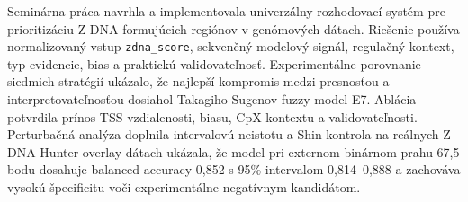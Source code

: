 \documentclass[12pt,a4paper]{article}
\begin{document}
Seminárna práca navrhla a implementovala univerzálny rozhodovací systém pre prioritizáciu Z-DNA-formujúcich regiónov v genómových dátach. Riešenie používa normalizovaný vstup \texttt{zdna\_score}, sekvenčný modelový signál, regulačný kontext, typ evidencie, bias a praktickú validovateľnosť. Experimentálne porovnanie siedmich stratégií ukázalo, že najlepší kompromis medzi presnosťou a interpretovateľnosťou dosiahol Takagiho-Sugenov fuzzy model E7. Ablácia potvrdila prínos TSS vzdialenosti, biasu, CpX kontextu a validovateľnosti. Perturbačná analýza doplnila intervalovú neistotu a Shin kontrola na reálnych Z-DNA Hunter overlay dátach ukázala, že model pri externom binárnom prahu 67,5 bodu dosahuje balanced accuracy 0,852 s 95\% intervalom 0,814--0,888 a zachováva vysokú špecificitu voči experimentálne negatívnym kandidátom.



\end{document}
